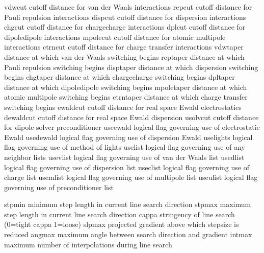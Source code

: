 \documentclass[letterpaper,11pt,english]{sphinxmanual}
\begin{document}

\begin{sphinxVerbatim}[commandchars=\\\{\}]
vdwcut          cutoff distance for van der Waals interactions
repcut          cutoff distance for Pauli repulsion interactions
dispcut         cutoff distance for dispersion interactions
chgcut          cutoff distance for charge\PYGZhy{}charge interactions
dplcut          cutoff distance for dipole\PYGZhy{}dipole interactions
mpolecut        cutoff distance for atomic multipole interactions
ctrncut         cutoff distance for charge transfer interactions
vdwtaper        distance at which van der Waals switching begins
reptaper        distance at which Pauli repulsion switching begins
disptaper       distance at which dispersion switching begins
chgtaper        distance at which charge\PYGZhy{}charge switching begins
dpltaper        distance at which dipole\PYGZhy{}dipole switching begins
mpoletaper      distance at which atomic multipole switching begins
ctrntaper       distance at which charge transfer switching begins
ewaldcut        cutoff distance for real space Ewald electrostatics
dewaldcut       cutoff distance for real space Ewald dispersion
usolvcut        cutoff distance for dipole solver preconditioner
use\PYGZus{}ewald       logical flag governing use of electrostatic Ewald
use\PYGZus{}dewald      logical flag governing use of dispersion Ewald
use\PYGZus{}lights      logical flag governing use of method of lights
use\PYGZus{}list        logical flag governing use of any neighbor lists
use\PYGZus{}vlist       logical flag governing use of van der Waals list
use\PYGZus{}dlist       logical flag governing use of dispersion list
use\PYGZus{}clist       logical flag governing use of charge list
use\PYGZus{}mlist       logical flag governing use of multipole list
use\PYGZus{}ulist       logical flag governing use of preconditioner list
\end{sphinxVerbatim}


\begin{sphinxVerbatim}[commandchars=\\\{\}]
stpmin          minimum step length in current line search direction
stpmax          maximum step length in current line search direction
cappa           stringency of line search (0=tight \PYGZlt{} cappa \PYGZlt{} 1=loose)
slpmax          projected gradient above which stepsize is reduced
angmax          maximum angle between search direction and \PYGZhy{}gradient
intmax          maximum number of interpolations during line search
\end{sphinxVerbatim}
\end{document}
